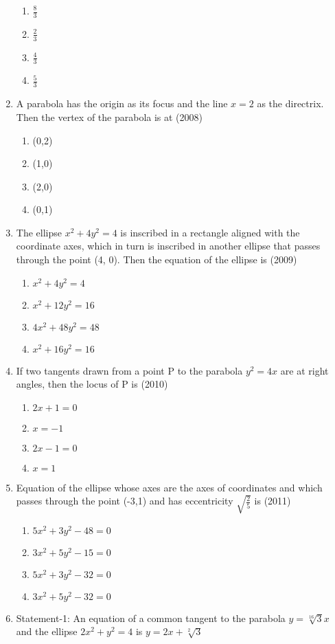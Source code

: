 \documentclass[12pt]{article}
\begin{document}
\begin{enumerate}
\begin{enumerate}
\item $\frac{8}{3}$
\item $\frac{2}{3}$
\item $\frac{4}{3}$
\item $\frac{5}{3}$
\end{enumerate}
\item A parabola has the origin as its focus and the line $x=2$ as the directrix. Then the vertex of the parabola is at (2008)
\begin{enumerate}
\item (0,2)
\item (1,0)
\item (2,0)
\item (0,1)
\end{enumerate}
\item The ellipse $x^2+4y^2=4$ is inscribed in a rectangle aligned with the coordinate axes, which in turn is inscribed in another ellipse that passes through the point (4, 0). Then the equation of the ellipse is (2009)
\begin{enumerate}
\item $x^2+4y^2=4$
\item $x^2+12y^2=16$
\item $4x^2+48y^2=48$
\item $x^2+16y^2=16$
\end{enumerate}
\item If two tangents drawn from a point P to the parabola $y^2=4x$ are at right angles, then the locus of P is (2010)
\begin{enumerate}
\item $2x+1=0$
\item $x=-1$
\item $2x-1=0$
\item $x=1$
\end{enumerate}
\item Equation of the ellipse whose axes are the axes of coordinates and which passes through the point (-3,1) and has eccentricity $\sqrt{\frac{2}{5}}$ is (2011)
\begin{enumerate}
\item $5x^2+3y^2-48=0$
\item $3x^2+5y^2-15=0$
\item $5x^2+3y^2-32=0$
\item $3x^2+5y^2-32=0$
\end{enumerate}
\item Statement-1: An equation of a common tangent to the parabola $y=\sqrt[16]{3}x$ and the ellipse $2x^2+y^2=4$ is $y=2x+\sqrt[2]{3}$\\

\end{enumerate}
\end{document}
